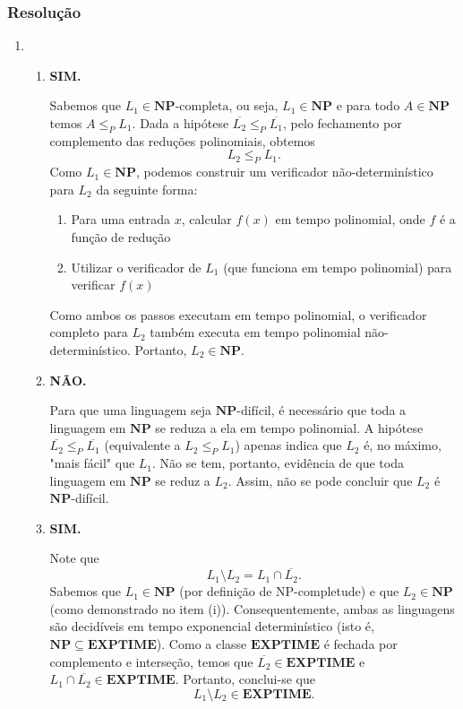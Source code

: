 \documentclass[a4paper,12pt]{article}
\begin{document}
\subsubsection*{Resolução}
\begin{enumerate}[label=\alph*)]
  \item
  \begin{enumerate}[label=(\roman*)]
    \item \textbf{SIM.}

    \vspace{0.3cm}
    Sabemos que $L_1 \in \mathbf{NP}\text{-completa}$, ou seja, $L_1 \in \mathbf{NP}$ e para todo $A \in \mathbf{NP}$ temos $A \leq_P L_1$.  
    Dada a hipótese $\overline{L_2} \leq_P \overline{L_1}$, pelo fechamento por complemento das reduções polinomiais, obtemos 
    $$L_2 \leq_P L_1.$$ 
    Como $L_1 \in \mathbf{NP}$, podemos construir um verificador não-determinístico para $L_2$ da seguinte forma:
    \begin{enumerate}
      \item Para uma entrada $x$, calcular $f(x)$ em tempo polinomial, onde $f$ é a função de redução
      \item Utilizar o verificador de $L_1$ (que funciona em tempo polinomial) para verificar $f(x)$
    \end{enumerate}
    Como ambos os passos executam em tempo polinomial, o verificador completo para $L_2$ também executa em tempo polinomial não-determinístico. Portanto, $L_2 \in \mathbf{NP}$.

    \vspace{0.5cm}
    \item \textbf{NÃO.}

    \vspace{0.3cm}
    Para que uma linguagem seja $\mathbf{NP}\text{-difícil}$, é necessário que toda a linguagem em $\mathbf{NP}$ se reduza a ela em tempo polinomial.  
    A hipótese $\overline{L_2} \leq_P \overline{L_1}$ (equivalente a $L_2 \leq_P L_1$) apenas indica que $L_2$ é, no máximo, "mais fácil" que $L_1$.  
    Não se tem, portanto, evidência de que toda linguagem em $\mathbf{NP}$ se reduz a $L_2$.  
    Assim, não se pode concluir que $L_2$ é $\mathbf{NP}$-difícil.

    \vspace{0.5cm}
    \item \textbf{SIM.}

    \vspace{0.3cm}
    Note que
    $$L_1 \setminus L_2 = L_1 \cap \overline{L_2}.$$
    Sabemos que $L_1 \in \mathbf{NP}$ (por definição de NP-completude) e que $L_2 \in \mathbf{NP}$ (como demonstrado no item (i)). Consequentemente, ambas as linguagens são decidíveis em tempo exponencial determinístico (isto é, $\mathbf{NP} \subseteq \mathbf{EXPTIME}$).  
    Como a classe $\mathbf{EXPTIME}$ é fechada por complemento e interseção, temos que $\overline{L_2} \in \mathbf{EXPTIME}$ e $L_1 \cap \overline{L_2} \in \mathbf{EXPTIME}$.
    Portanto, conclui-se que
    $$L_1 \setminus L_2 \in \mathbf{EXPTIME}.$$
  \end{enumerate}
\end{enumerate}
\end{document}
